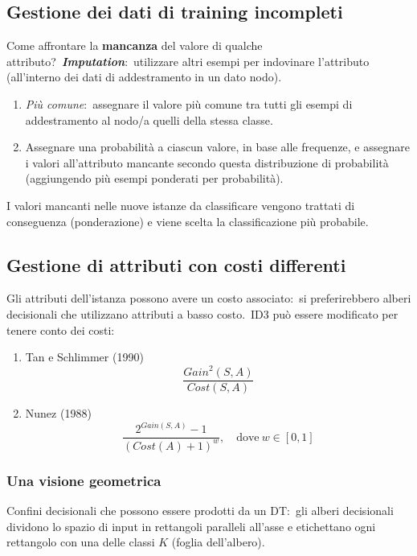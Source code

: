 \subsection{Gestione dei dati di training incompleti}

Come affrontare la \textbf{mancanza} del valore di qualche attributo?\
\textbf{\textit{Imputation}}:\ utilizzare altri esempi per indovinare l'attributo (all'interno dei dati di addestramento in un dato nodo).
\begin{enumerate}
	\item \textit{Più comune}:\ assegnare il valore più comune tra tutti gli esempi di addestramento al nodo/a quelli della stessa classe.
	\item Assegnare una probabilità a ciascun valore, in base alle frequenze, e assegnare i valori all'attributo mancante secondo questa distribuzione di probabilità (aggiungendo più esempi ponderati per probabilità).
\end{enumerate}

\noindent I valori mancanti nelle nuove istanze da classificare vengono trattati di conseguenza (ponderazione) e viene scelta la classificazione più probabile.\

\subsection{Gestione di attributi con costi differenti}

Gli attributi dell'istanza possono avere un costo associato:\ si preferirebbero alberi decisionali che utilizzano attributi a basso costo.\
ID3 può essere modificato per tenere conto dei costi:
\begin{enumerate}
	\item Tan e Schlimmer (1990)
	      \[ \frac{\mathit{Gain}^2(S,A)}{\mathit{Cost}(S,A)}\]
	\item Nunez (1988)
	      \[\frac{2^{\mathit{Gain}(S,A)}-1}{\left(\mathit{Cost}(A) +1\right)^w}, \quad \mathrm{dove}\ w \in [0,1]\]
\end{enumerate}

\subsubsection{Una visione geometrica}

Confini decisionali che possono essere prodotti da un DT:\ gli alberi decisionali dividono lo spazio di input in rettangoli paralleli all'asse e etichettano ogni rettangolo con una delle classi $K$ (foglia dell'albero).\

